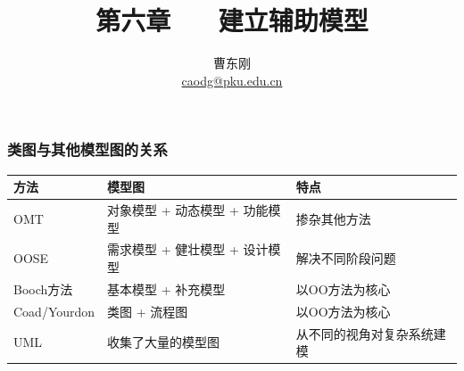 \documentclass[compress]{beamer}
\begin{document}

					
\title{第六章 ~~ 建立辅助模型}

\author[面向对象的分析与设计]
{曹东刚\\\href{mailto:caodg@pku.edu.cn}{caodg@pku.edu.cn}}


\date{}


\begin{frame}[plain]
	\titlepage
\end{frame}

\setcounter{framenumber}{0}

\begin{frame}
  \frametitle{类图与其他模型图的关系}

  \noindent\begin{tabular}{lp{4cm} p{3.2cm}} \hline
    方法 & 模型图 & 特点 \\ \hline\hline
  OMT     & 对象模型 + 动态模型 + 功能模型 & 掺杂其他方法 \\ \hline
  OOSE    & 需求模型 + 健壮模型 + 设计模型 & 解决不同阶段问题 \\ \hline
  Booch方法 & 基本模型 + 补充模型 & 以OO方法为核心 \\ \hline
  Coad/Yourdon &  类图 + 流程图 & 以OO方法为核心 \\ \hline
  UML & 收集了大量的模型图 & 从不同的视角对复杂系统建模 \\ \hline
\end{tabular}
\end{frame}
\end{document}
